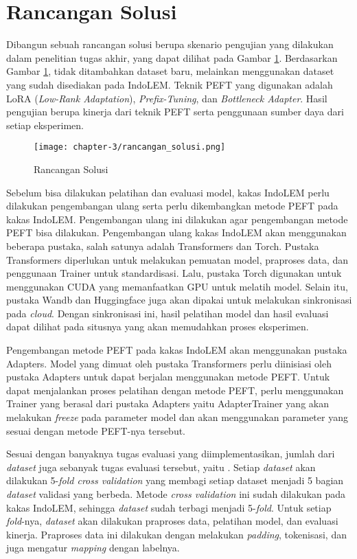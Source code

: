 \section{Rancangan Solusi}
\label{sec:rancangan-solusi}

Dibangun sebuah rancangan solusi berupa skenario pengujian yang dilakukan dalam penelitian tugas akhir, yang dapat dilihat pada Gambar \ref{fig:rancangan-solusi}. Berdasarkan Gambar \ref{fig:rancangan-solusi}, tidak ditambahkan dataset baru, melainkan menggunakan dataset yang sudah disediakan pada IndoLEM. Teknik PEFT yang digunakan adalah LoRA (\textit{Low-Rank Adaptation}), \textit{Prefix-Tuning}, dan \textit{Bottleneck Adapter}. Hasil pengujian berupa kinerja dari teknik PEFT serta penggunaan sumber daya dari setiap eksperimen.

\begin{figure}[ht]
    \centering
    \texttt{[image: chapter-3/rancangan\_solusi.png]}
    \caption{Rancangan Solusi}
    \label{fig:rancangan-solusi}
\end{figure}

Sebelum bisa dilakukan pelatihan dan evaluasi model, kakas IndoLEM perlu dilakukan pengembangan ulang serta perlu dikembangkan metode PEFT pada kakas IndoLEM. Pengembangan ulang ini dilakukan agar pengembangan metode PEFT bisa dilakukan. Pengembangan ulang kakas IndoLEM akan menggunakan beberapa pustaka, salah satunya adalah Transformers dan Torch. Pustaka Transformers diperlukan untuk melakukan pemuatan model, praproses data, dan penggunaan Trainer untuk standardisasi. Lalu, pustaka Torch digunakan untuk menggunakan CUDA yang memanfaatkan GPU untuk melatih model. Selain itu, pustaka Wandb dan Huggingface juga akan dipakai untuk melakukan sinkronisasi pada \textit{cloud}. Dengan sinkronisasi ini, hasil pelatihan model dan hasil evaluasi dapat dilihat pada situsnya yang akan memudahkan proses eksperimen. 

Pengembangan metode PEFT pada kakas IndoLEM akan menggunakan pustaka Adapters. Model yang dimuat oleh pustaka Transformers perlu diinisiasi oleh pustaka Adapters untuk dapat berjalan menggunakan metode PEFT. Untuk dapat menjalankan proses pelatihan dengan metode PEFT, perlu menggunakan Trainer yang berasal dari pustaka Adapters yaitu AdapterTrainer yang akan melakukan \textit{freeze} pada parameter model dan akan menggunakan parameter yang sesuai dengan metode PEFT-nya tersebut.

Sesuai dengan banyaknya tugas evaluasi yang diimplementasikan, jumlah dari \textit{dataset} juga sebanyak tugas evaluasi tersebut, yaitu \nlptask. Setiap \textit{dataset} akan dilakukan 5-\textit{fold cross validation} yang membagi setiap dataset menjadi 5 bagian \textit{dataset} validasi yang berbeda. Metode \textit{cross validation} ini sudah dilakukan pada kakas IndoLEM, sehingga \textit{dataset} sudah terbagi menjadi 5-\textit{fold}. Untuk setiap \textit{fold}-nya, \textit{dataset} akan dilakukan praproses data, pelatihan model, dan evaluasi kinerja. Praproses data ini dilakukan dengan melakukan \textit{padding}, tokenisasi, dan juga mengatur \textit{mapping} dengan labelnya. 


